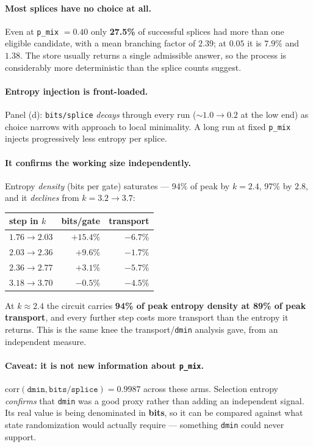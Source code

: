 \documentclass[11pt]{article}
\begin{document}
\paragraph{Most splices have no choice at all.} Even at \texttt{p\_mix} $=0.40$
only \textbf{27.5\%} of successful splices had more than one eligible candidate,
with a mean branching factor of $2.39$; at $0.05$ it is $7.9\%$ and $1.38$. The
store usually returns a single admissible answer, so the process is considerably
more deterministic than the splice counts suggest.

\paragraph{Entropy injection is front-loaded.} Panel (d): \texttt{bits/splice}
\emph{decays} through every run (${\sim}1.0 \to 0.2$ at the low end) as choice
narrows with approach to local minimality. A long run at fixed \texttt{p\_mix}
injects progressively less entropy per splice.

\paragraph{It confirms the working size independently.} Entropy \emph{density}
(bits per gate) saturates --- 94\% of peak by $k=2.4$, 97\% by $2.8$, and it
\emph{declines} from $k=3.2 \to 3.7$:

\begin{center}
\begin{tabular}{lrr}
\toprule
step in $k$ & bits/gate & transport \\
\midrule
$1.76 \to 2.03$ & $+15.4\%$ & $-6.7\%$ \\
$2.03 \to 2.36$ & $+9.6\%$  & $-1.7\%$ \\
$2.36 \to 2.77$ & $+3.1\%$  & $-5.7\%$ \\
$3.18 \to 3.70$ & $-0.5\%$  & $-4.5\%$ \\
\bottomrule
\end{tabular}
\end{center}

At $k \approx 2.4$ the circuit carries \textbf{94\% of peak entropy density at
89\% of peak transport}, and every further step costs more transport than the
entropy it returns. This is the same knee the transport/\texttt{dmin} analysis
gave, from an independent measure.

\paragraph{Caveat: it is not new information about \texttt{p\_mix}.}
$\mathrm{corr}(\texttt{dmin}, \texttt{bits/splice}) = 0.9987$ across these arms.
Selection entropy \emph{confirms} that \texttt{dmin} was a good proxy rather than
adding an independent signal. Its real value is being denominated in \textbf{bits},
so it can be compared against what state randomization would actually require ---
something \texttt{dmin} could never support.
\end{document}
